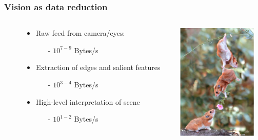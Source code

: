 \documentclass[notheorems,serif,table,compress]{beamer}  %
\begin{document}
\begin{frame}
\frametitle{Vision as data reduction}
\begin{columns}
\begin{column}{\leftmargini}
\end{column}
\begin{column}{0.55\linewidth}
\begin{itemize}
\item Raw feed from camera/eyes:
\begin{itemize}
\item[-] {\huge \color{blue}$10^{7-9}$} Bytes/s
\end{itemize}
\item Extraction of edges and salient features
\begin{itemize}
\item[-] {\huge \color{blue}$10^{3-4}$} Bytes/s
\end{itemize}
\item High-level interpretation of scene
\begin{itemize}
\item[-] {\huge \color{blue}$10^{1-2}$} Bytes/s
\end{itemize}
\end{itemize}
\end{column}

\begin{column}{0.45\linewidth}
\centering\includegraphics[width=1.5in]{friendshipLove}
\end{column}
\end{columns}\vspace{1ex}

\end{frame}
\end{document}
